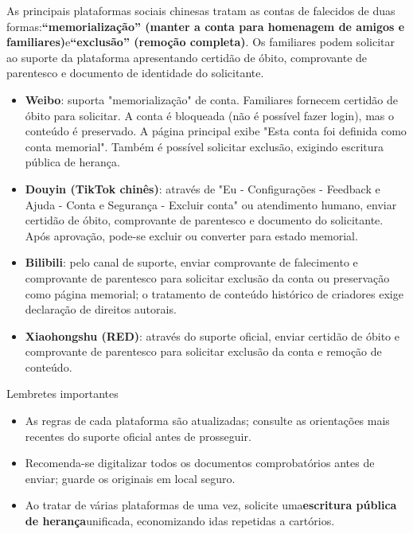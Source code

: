 As principais plataformas sociais chinesas tratam as contas de falecidos de duas formas:\textbf{“memorialização” (manter a conta para homenagem de amigos e familiares)}e\textbf{“exclusão” (remoção completa)}. Os familiares podem solicitar ao suporte da plataforma apresentando certidão de óbito, comprovante de parentesco e documento de identidade do solicitante.

\begin{itemize}
  \item \textbf{Weibo}: suporta "memorialização" de conta. Familiares fornecem certidão de óbito para solicitar. A conta é bloqueada (não é possível fazer login), mas o conteúdo é preservado. A página principal exibe "Esta conta foi definida como conta memorial". Também é possível solicitar exclusão, exigindo escritura pública de herança.
  \item \textbf{Douyin (TikTok chinês)}: através de "Eu - Configurações - Feedback e Ajuda - Conta e Segurança - Excluir conta" ou atendimento humano, enviar certidão de óbito, comprovante de parentesco e documento do solicitante. Após aprovação, pode-se excluir ou converter para estado memorial.
  \item \textbf{Bilibili}: pelo canal de suporte, enviar comprovante de falecimento e comprovante de parentesco para solicitar exclusão da conta ou preservação como página memorial; o tratamento de conteúdo histórico de criadores exige declaração de direitos autorais.
  \item \textbf{Xiaohongshu (RED)}: através do suporte oficial, enviar certidão de óbito e comprovante de parentesco para solicitar exclusão da conta e remoção de conteúdo.
\end{itemize}

\begin{tcbinfo}{Lembretes importantes}
\begin{itemize}
  \item As regras de cada plataforma são atualizadas; consulte as orientações mais recentes do suporte oficial antes de prosseguir.
  \item Recomenda-se digitalizar todos os documentos comprobatórios antes de enviar; guarde os originais em local seguro.
  \item Ao tratar de várias plataformas de uma vez, solicite uma\textbf{escritura pública de herança}unificada, economizando idas repetidas a cartórios.
\end{itemize}

\end{tcbinfo}

